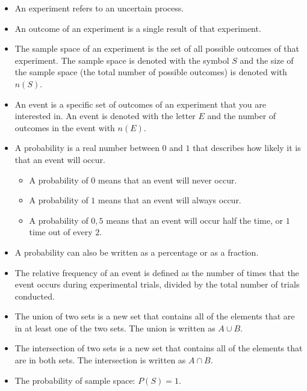 \begin{itemize}
\item An experiment refers to an uncertain process.

\item An outcome of an experiment is a single
  result of that experiment.

\item The sample space of an experiment is
  the set of all possible outcomes of that experiment. The sample
  space is denoted with the symbol $S$ and the size of the sample
  space (the total number of possible outcomes) is denoted with
  $n(S)$.

\item An event is a specific set of outcomes of an
  experiment that you are interested in. An event is denoted with the
  letter $E$ and the number of outcomes in the event with $n(E)$.

\item A probability is a real number between
  $0$ and $1$ that describes how likely it is that an event will occur.
\begin{itemize}
\item A probability of $0$ means that an event will never occur.
\item A probability of $1$ means that an event will always occur.
\item A probability of $0,5$ means that an event will occur half the
  time, or $1$ time out of every $2$.
\end{itemize}

\item A probability can also be written as a percentage or as a fraction.

\item The relative frequency of an event is
  defined as the number of times that the event occurs during
  experimental trials, divided by the total number of trials
  conducted.

\item The union of two sets is a new set that contains
  all of the elements that are in at least one of the two sets. The
  union is written as $A \cup B$.

\item The intersection of two sets is a new set
  that contains all of the elements that are in both sets. The
  intersection is written as $A \cap B$.

\item The probability of sample space:  $P(S)=1$.


\end{itemize}
